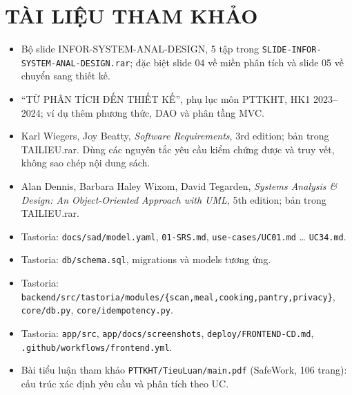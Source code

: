 \chapter*{TÀI LIỆU THAM KHẢO}
\begin{itemize}
\item [L1] Bộ slide INFOR-\allowbreak{}SYSTEM-\allowbreak{}ANAL-\allowbreak{}DESIGN, 5 tập trong {\small\texttt{SLIDE-\allowbreak{}INFOR-\allowbreak{}SYSTEM-\allowbreak{}ANAL-\allowbreak{}DESIGN.\allowbreak{}rar}}; đặc biệt slide 04 về miền phân tích và slide 05 về chuyển sang thiết kế.
\item [L2] ``TỪ PHÂN TÍCH ĐẾN THIẾT KẾ'', phụ lục môn PTTKHT, HK1 2023--2024; ví dụ thêm phương thức, DAO và phân tầng MVC.
\item [L3] Karl Wiegers, Joy Beatty, \emph{Software Requirements}, 3rd edition; bản trong TAILIEU.rar. Dùng các nguyên tắc yêu cầu kiểm chứng được và truy vết, không sao chép nội dung sách.
\item [L4] Alan Dennis, Barbara Haley Wixom, David Tegarden, \emph{Systems Analysis \& Design: An Object-\allowbreak{}Oriented Approach with UML}, 5th edition; bản trong TAILIEU.rar.
\item [R1] Tastoria: {\small\texttt{docs/\allowbreak{}\allowbreak{}sad/\allowbreak{}\allowbreak{}model.\allowbreak{}yaml}}, {\small\texttt{01-\allowbreak{}SRS.\allowbreak{}md}}, {\small\texttt{use-\allowbreak{}cases/\allowbreak{}\allowbreak{}UC01.\allowbreak{}md}} \ldots{} {\small\texttt{UC34.\allowbreak{}md}}.
\item [R2] Tastoria: {\small\texttt{db/\allowbreak{}\allowbreak{}schema.\allowbreak{}sql}}, migrations và models tương ứng.
\item [R3] Tastoria: {\small\texttt{backend/\allowbreak{}\allowbreak{}src/\allowbreak{}\allowbreak{}tastoria/\allowbreak{}\allowbreak{}modules/\allowbreak{}\allowbreak{}\{scan,meal,cooking,pantry,privacy\}}}, {\small\texttt{core/\allowbreak{}\allowbreak{}db.\allowbreak{}py}}, {\small\texttt{core/\allowbreak{}\allowbreak{}idempotency.\allowbreak{}py}}.
\item [R4] Tastoria: {\small\texttt{app/\allowbreak{}\allowbreak{}src}}, {\small\texttt{app/\allowbreak{}\allowbreak{}docs/\allowbreak{}\allowbreak{}screenshots}}, {\small\texttt{deploy/\allowbreak{}\allowbreak{}FRONTEND-\allowbreak{}CD.\allowbreak{}md}}, {\small\texttt{.\allowbreak{}github/\allowbreak{}\allowbreak{}workflows/\allowbreak{}\allowbreak{}frontend.\allowbreak{}yml}}.
\item [L5] Bài tiểu luận tham khảo {\small\texttt{PTTKHT/\allowbreak{}\allowbreak{}TieuLuan/\allowbreak{}\allowbreak{}main.\allowbreak{}pdf}} (SafeWork, 106 trang): cấu trúc xác định yêu cầu và phân tích theo UC.

\end{itemize}
